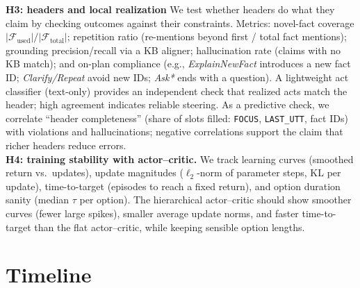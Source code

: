 \documentclass[12pt]{article}
\begin{document}
\textbf{H3: headers and local realization}
We test whether headers do what they claim by checking outcomes against their constraints. Metrics: novel-fact coverage \(|\mathcal{F}_{\text{used}}|/|\mathcal{F}_{\text{total}}|\); repetition ratio (re-mentions beyond first / total fact mentions); grounding precision/recall via a KB aligner; hallucination rate (claims with no KB match); and on-plan compliance (e.g., \textit{ExplainNewFact} introduces a new fact ID; \textit{Clarify/Repeat} avoid new IDs; \textit{Ask*} ends with a question). A lightweight act classifier (text-only) provides an independent check that realized acts match the header; high agreement indicates reliable steering. As a predictive check, we correlate “header completeness” (share of slots filled: \texttt{FOCUS}, \texttt{LAST\_UTT}, fact IDs) with violations and hallucinations; negative correlations support the claim that richer headers reduce errors.\\

\textbf{H4: training stability with actor–critic.}
We track learning curves (smoothed return vs.\ updates), update magnitudes (\(\ell_2\)-norm of parameter steps, KL per update), time-to-target (episodes to reach a fixed return), and option duration sanity (median \(\tau\) per option). The hierarchical actor–critic should show smoother curves (fewer large spikes), smaller average update norms, and faster time-to-target than the flat actor–critic, while keeping sensible option lengths.\\


\section{Timeline}
\end{document}

